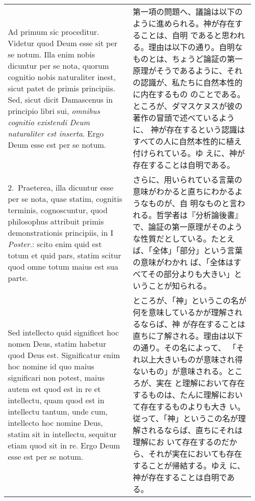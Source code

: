 \documentclass[10pt]{jsarticle}
\begin{document}
\begin{longtable}{p{21em}p{21em}}

{\huge A}{\sc d primum sic proceditur}. Videtur quod Deum esse sit per
se notum. Illa enim nobis dicuntur per se nota, quorum cognitio nobis
naturaliter inest, sicut patet de primis principiis. Sed, sicut dicit
Damascenus in principio libri sui, {\it omnibus cognitio existendi
Deum naturaliter est inserta}. Ergo Deum esse est per se notum.


&

第一項の問題へ、議論は以下のように進められる。神が存在することは、自明
であると思われる。理由は以下の通り。自明なものとは、ちょうど論証の第一
原理がそうであるように、それの認識が、私たちに自然本性的に内在するもの
のことである。ところが、ダマスケヌスが彼の著作の冒頭で述べているように、
神が存在するという認識はすべての人に自然本性的に植え付けられている。ゆ
えに、神が存在することは自明である。


\\


2.~{\sc Praeterea}, illa dicuntur esse per se nota,
quae statim, cognitis terminis, cognoscuntur, quod philosophus attribuit
primis demonstrationis principiis, in I {\it Poster}.: scito enim quid est
totum et quid pars, statim scitur quod omne totum maius est sua
parte. 

&

さらに、用いられている言葉の意味がわかると直ちにわかるようなものが、自
明なものと言われる。哲学者は『分析論後書』で、論証の第一原理がそのよう
な性質だとしている。たとえば、「全体」「部分」という言葉の意味がわかれ
ば、「全体はすべてその部分よりも大きい」ということが知られる。

\\

Sed intellecto quid significet hoc nomen Deus, statim habetur quod
Deus est. Significatur enim hoc nomine id quo maius significari non
potest, maius autem est quod est in re et intellectu, quam quod est in
intellectu tantum, unde cum, intellecto hoc nomine Deus, statim sit in
intellectu, sequitur etiam quod sit in re. Ergo Deum esse est per se
notum.


&

ところが、「神」というこの名が何を意味しているかが理解されるならば、神
が存在することは直ちに了解される。理由は以下の通り。その名によって、
「それ以上大きいものが意味され得ないもの」が意味される。ところが、実在
と理解において存在するものは、たんに理解において存在するものよりも大き
い。従って、「神」というこの名が理解されるならば、直ちにそれは理解にお
いて存在するのだから、それが実在においても存在することが帰結する。ゆえ
に、神が存在することは自明である。


\end{longtable}
\end{document}
